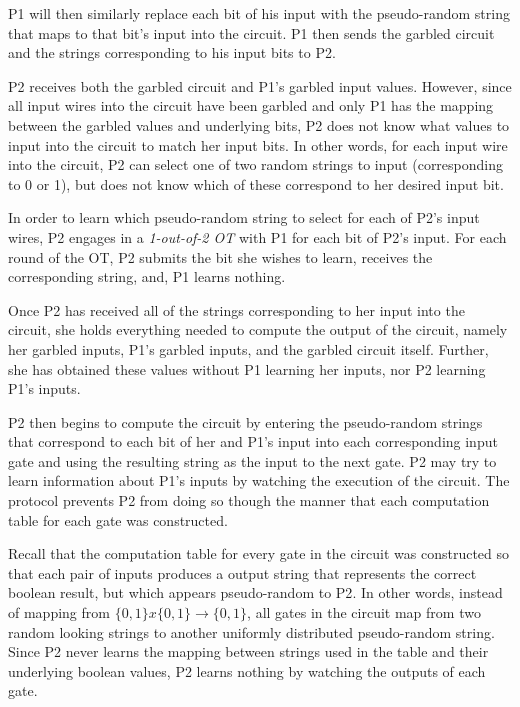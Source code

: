 \ac{P1} will then similarly replace each bit of his input with the pseudo-random string that maps to that bit's input into the circuit. \ac{P1} then sends the garbled circuit and the strings corresponding to his input bits to \ac{P2}.

\ac{P2} receives both the garbled circuit and \ac{P1}'s garbled input values. However, since all input wires into the circuit have been garbled and only \ac{P1} has the mapping between the garbled values and underlying bits, \ac{P2} does not know what values to input into the circuit to match her input bits.
In other words, for each input wire into the circuit, \ac{P2} can select one of two random strings to input (corresponding to 0 or 1), but does not know which of these correspond to her desired input bit.

In order to learn which pseudo-random string to select for each of \ac{P2}'s input wires, \ac{P2} engages in a \emph{1-out-of-2 \ac{OT}} with \ac{P1} for each bit of \ac{P2}'s input. For each round of the \ac{OT}, \ac{P2} submits the bit she wishes to learn, receives the corresponding string, and, \ac{P1} learns nothing.

Once \ac{P2} has received all of the strings corresponding to her input into the circuit, she holds everything needed to compute the output of the circuit, namely her garbled inputs, \ac{P1}'s garbled inputs, and the garbled circuit itself. Further, she has obtained these values without \ac{P1} learning her inputs, nor \ac{P2} learning \ac{P1}'s inputs.

\ac{P2} then begins to compute the circuit by entering the pseudo-random strings that correspond to each bit of her and \ac{P1}'s input into each corresponding input gate and using the resulting string as the input to the next gate. \ac{P2} may try to learn information about \ac{P1}'s inputs by watching the execution of the circuit. The protocol prevents \ac{P2} from doing so though the manner that each computation table for each gate was constructed.

Recall that the computation table for every gate in the circuit was constructed so that each pair of inputs produces a output string that represents the correct boolean result, but which appears pseudo-random to \ac{P2}.  In other words, instead of mapping from $\{0, 1\} x \{0, 1\} \to \{0, 1\}$, all gates in the circuit map from two random looking strings to another uniformly distributed pseudo-random string. Since \ac{P2} never learns the mapping between strings used in the table and their underlying boolean values, \ac{P2} learns nothing by watching the outputs of each gate.

